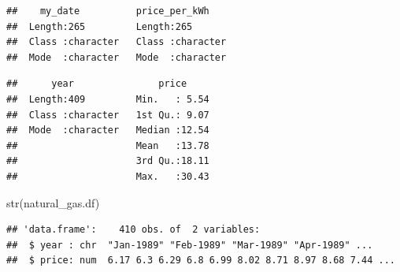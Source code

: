 \documentclass[
]{article}
\newenvironment{Shaded}{\begin{snugshade}}{\end{snugshade}}
\newcommand{\AttributeTok}[1]{\textcolor[rgb]{0.77,0.63,0.00}{#1}}
\newcommand{\CommentTok}[1]{\textcolor[rgb]{0.56,0.35,0.01}{\textit{#1}}}
\newcommand{\ConstantTok}[1]{\textcolor[rgb]{0.00,0.00,0.00}{#1}}
\newcommand{\DecValTok}[1]{\textcolor[rgb]{0.00,0.00,0.81}{#1}}
\newcommand{\FunctionTok}[1]{\textcolor[rgb]{0.00,0.00,0.00}{#1}}
\newcommand{\NormalTok}[1]{#1}
\newcommand{\OtherTok}[1]{\textcolor[rgb]{0.56,0.35,0.01}{#1}}
\newcommand{\SpecialCharTok}[1]{\textcolor[rgb]{0.00,0.00,0.00}{#1}}
\newcommand{\StringTok}[1]{\textcolor[rgb]{0.31,0.60,0.02}{#1}}
\begin{document}
\begin{verbatim}
##    my_date          price_per_kWh     
##  Length:265         Length:265        
##  Class :character   Class :character  
##  Mode  :character   Mode  :character
\end{verbatim}

\begin{Shaded}
\end{Shaded}

\begin{verbatim}
##      year               price      
##  Length:409         Min.   : 5.54  
##  Class :character   1st Qu.: 9.07  
##  Mode  :character   Median :12.54  
##                     Mean   :13.78  
##                     3rd Qu.:18.11  
##                     Max.   :30.43
\end{verbatim}

\begin{Shaded}
\begin{Highlighting}[]
\FunctionTok{str}\NormalTok{(natural\_gas.df)}
\end{Highlighting}
\end{Shaded}

\begin{verbatim}
## 'data.frame':    410 obs. of  2 variables:
##  $ year : chr  "Jan-1989" "Feb-1989" "Mar-1989" "Apr-1989" ...
##  $ price: num  6.17 6.3 6.29 6.8 6.99 8.02 8.71 8.97 8.68 7.44 ...
\end{verbatim}
\end{document}
